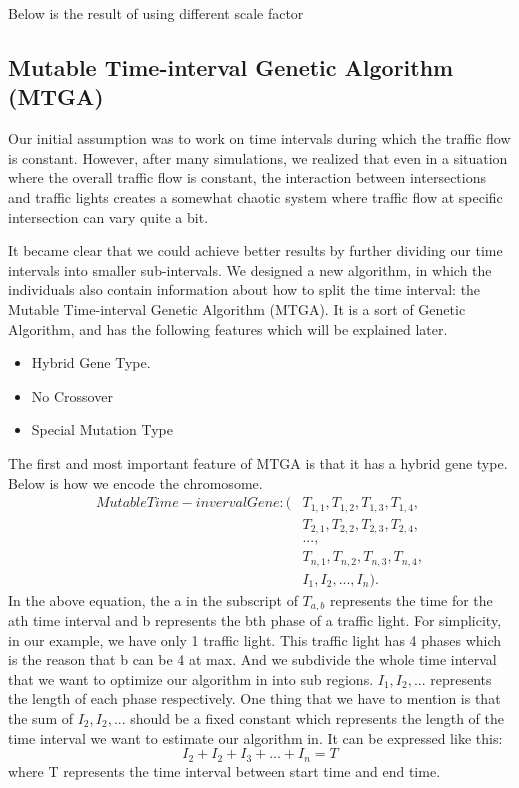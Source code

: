 \documentclass{article} %
\begin{document}
Below is the result of using different scale factor 

\subsection{Mutable Time-interval Genetic Algorithm (MTGA)}
Our initial assumption was to work on time intervals during which the traffic flow is constant. However, after many simulations, we realized that even in a situation where the overall traffic flow is constant, the interaction between intersections and traffic lights creates a somewhat chaotic system where traffic flow at specific intersection can vary quite a bit. 

It became clear that we could achieve better results by further dividing our time intervals into smaller sub-intervals. We designed a new algorithm, in which the individuals also contain information about how to split the time interval: the Mutable Time-interval Genetic Algorithm (MTGA). It is a sort of Genetic Algorithm, and has the following features which will be explained later.
\begin{itemize}
	\item Hybrid Gene Type.
	\item No Crossover
	\item Special Mutation Type
\end{itemize}
The first and most important feature of MTGA is that it has a hybrid gene type. Below is how we encode the chromosome.
\begin{align}
Mutable Time-inverval Gene:
(&T_{1,1}, T_{1,2}, T_{1,3}, T_{1,4},\\
&T_{2,1}, T_{2,2}, T_{2,3}, T_{2,4},\\
&...,\\
&T_{n,1}, T_{n, 2}, T_{n,3}, T_{n, 4},\\
&I_1, I_2, ..., I_n).
\end{align}
In the above equation, the a in the subscript of $T_{a,b}$ represents the time for the ath time interval and b represents the bth phase of a traffic light. For simplicity, in our example, we have only 1 traffic light. This traffic light has 4 phases which is the reason that b can be 4 at max. And we subdivide the whole time interval that we want to optimize our algorithm in into  sub regions. $I_1, I_2, ...$ represents the length of each phase respectively. One thing that we have to mention is that the sum of $I_2, I_2, ...$ should be a fixed constant which represents the length of the time interval we want to estimate our algorithm in. It can be expressed like this:
\begin{equation}
\label{equ_sum_fixed}
I_2 + I_2 + I_3 + ... + I_n = T
\end{equation} 
where T represents the time interval between start time and end time.\\
\end{document}

